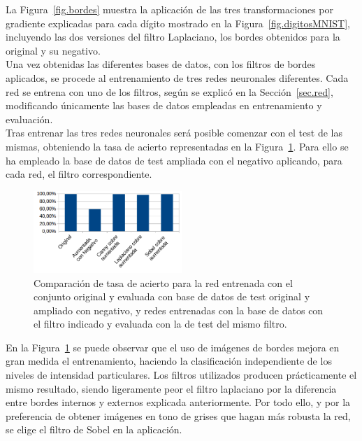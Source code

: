 La Figura~\ref{fig.bordes} muestra la aplicación de las tres transformaciones por gradiente explicadas para cada dígito mostrado en la Figura~\ref{fig.digitosMNIST}, incluyendo las dos versiones del filtro Laplaciano, los bordes obtenidos para la original y su negativo.\\

Una vez obtenidas las diferentes bases de datos, con los filtros de bordes aplicados, se procede al entrenamiento de tres redes neuronales diferentes. Cada red se entrena con uno de los filtros, según se explicó en la Sección~\ref{sec.red}, modificando únicamente las bases de datos empleadas en entrenamiento y evaluación.\\

Tras entrenar las tres redes neuronales será posible comenzar con el test de las mismas, obteniendo la tasa de acierto representadas en la Figura~\ref{fig.filtros}. Para ello se ha empleado la base de datos de test ampliada con el negativo aplicando, para cada red, el filtro correspondiente.

\begin{figure}[H]
	\begin{center}
		\includegraphics[width=0.5\textwidth]{figures/filtros}
		\caption{Comparación de tasa de acierto para la red entrenada con el conjunto original y evaluada con base de datos de test original y ampliado con negativo, y redes entrenadas con la base de datos con el filtro indicado y evaluada con la de test del mismo filtro.}
		\label{fig.filtros}
	\end{center}
\end{figure}

En la Figura~\ref{fig.filtros} se puede observar que el uso de imágenes de bordes mejora en gran medida el entrenamiento, haciendo la clasificación independiente de los niveles de intensidad particulares. Los filtros utilizados producen prácticamente el mismo resultado, siendo ligeramente peor el filtro laplaciano por la diferencia entre bordes internos y externos explicada anteriormente. Por todo ello, y por la preferencia de obtener imágenes en tono de grises que hagan más robusta la red, se elige el filtro de Sobel en la aplicación.\\

